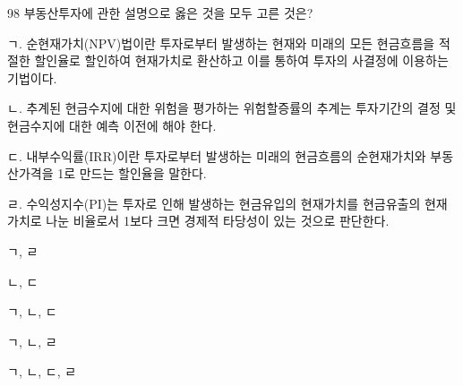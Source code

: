 \begin{question}{98}
부동산투자에 관한 설명으로 옳은 것을 모두 고른 것은?
\begin{framedtext}
ㄱ. 순현재가치(NPV)법이란 투자로부터 발생하는 현재와 미래의 모든 현금흐름을 적절한 할인율로 할인하여 현재가치로 환산하고 이를 통하여 투자의 사결정에 이용하는 기법이다. \par
ㄴ. 추계된 현금수지에 대한 위험을 평가하는 위험할증률의 추계는 투자기간의 결정 및 현금수지에 대한 예측 이전에 해야 한다. \par
ㄷ. 내부수익률(IRR)이란 투자로부터 발생하는 미래의 현금흐름의 순현재가치와 부동산가격을 1로 만드는 할인율을 말한다. \par
ㄹ. 수익성지수(PI)는 투자로 인해 발생하는 현금유입의 현재가치를 현금유출의 현재가치로 나눈 비율로서 1보다 크면 경제적 타당성이 있는 것으로 판단한다. \par
\end{framedtext}
\begin{choices}
  \item ㄱ, ㄹ
  \item ㄴ, ㄷ
  \item ㄱ, ㄴ, ㄷ
  \item ㄱ, ㄴ, ㄹ
  \item ㄱ, ㄴ, ㄷ, ㄹ
\end{choices}
\end{question}
